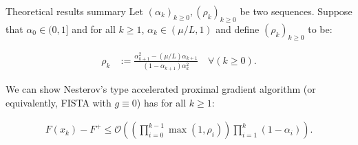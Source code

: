 \documentclass[11pt]{beamer}
\theoremstyle{definition}
\begin{document}
        \begin{frame}{Theoretical results summary}
            Let $(\alpha_k)_{k \ge0}, (\rho_k)_{k \ge 0}$ be two sequences. 
            Suppose that $\alpha_0 \in (0, 1]$ and for all $k \ge 1$, $\alpha_k \in (\mu/L, 1)$ and define $(\rho_k)_{k\ge0 }$ to be: 
            \begin{tcolorbox}\noindent\vspace{-1em}
                \begin{align*}
                    \rho_k &:= \frac{\alpha_{k + 1}^2 - (\mu/L)\alpha_{k + 1}}{(1 - \alpha_{k + 1})\alpha_k^2} \quad \forall (k \ge 0).
                \end{align*}
            \end{tcolorbox}
            We can show Nesterov's type accelerated proximal gradient algorithm (or equivalently, FISTA with $g \equiv 0$) has for all $k \ge 1$:
            \begin{tcolorbox}\noindent\vspace{-1em} 
                \begin{align*}
                    F(x_k) - F^+ 
                    \le
                    \mathcal O\left(
                        \left(
                            \prod_{i = 0}^{k - 1} \max(1, \rho_{i})
                        \right)
                        \prod_{i = 1}^{k} \left(1  - \alpha_i\right)
                    \right).
                \end{align*}
            \end{tcolorbox}
        \end{frame}
\end{document}
